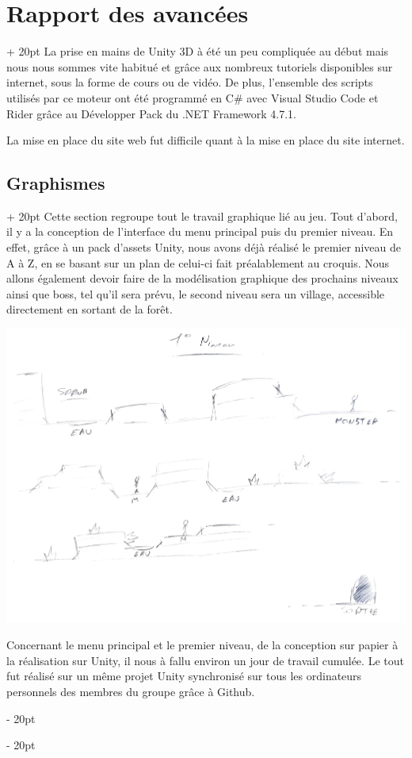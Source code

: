 \documentclass[a4paper, 12pt, twoside]{article}
\newcommand{\ind}[1][20pt]{\advance\leftskip + #1}
\newcommand{\deind}[1][20pt]{\advance\leftskip - #1}
\newenvironment{indt}[2][20pt]{#2 \par \ind[#1]}{\par \deind} %
\begin{document}
    \begin{indt}{\section{Rapport des avancées}}
        La prise en mains de Unity 3D à été un peu compliquée au début mais nous nous sommes vite habitué et grâce aux nombreux tutoriels disponibles sur internet, sous la forme de cours ou de vidéo. De plus, l'ensemble des scripts utilisés par ce moteur ont été programmé en C$\#$ avec Visual Studio Code et Rider grâce au Développer Pack du .NET Framework 4.7.1.

        La mise en place du site web fut difficile quant à la mise en place du site internet.

        \begin{indt}{\subsection{Graphismes}}
            Cette section regroupe tout le travail graphique lié au jeu. Tout d'abord, il y a la conception de l'interface du menu principal puis du premier niveau. En effet, grâce à un pack d'assets Unity, nous avons déjà réalisé le premier niveau de A à Z, en se basant sur un plan de celui-ci fait préalablement au croquis. Nous allons également devoir faire de la modélisation graphique des prochains niveaux ainsi que boss, tel qu'il sera prévu, le second niveau sera un village, accessible directement en sortant de la forêt.

            \begin{center}
                \includegraphics[width=0.5\linewidth]{Croquis.jpg}
            \end{center}

            Concernant le menu principal et le premier niveau, de la conception sur papier à la réalisation sur Unity, il nous à fallu environ un jour de travail cumulée. Le tout fut réalisé sur un même projet Unity synchronisé sur tous les ordinateurs personnels des membres du groupe grâce à Github.


\end{indt}
\end{indt}
\end{document}

